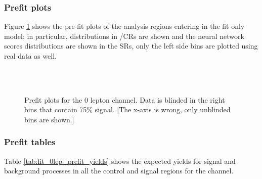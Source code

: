 \clearpage
\subsubsection{Prefit plots}
Figure \ref{fig:fit_0lep_prefit} shows the pre-fit plots of the analysis regions entering in the \zlep fit only model; 
in particular, \mjjtag distributions in \Wjets/\Zjets CRs are shown and the neural network scores distributions  are shown in the SRs, only the left side bins are plotted using real data as well.
\begin{figure}[ht]
      \centering
\\
\\
	\caption{Prefit plots for the 0 lepton channel. Data is blinded in the right bins that contain 75\% signal. [The x-axis is wrong, only unblinded bins are shown.]}
       \label{fig:fit_0lep_prefit}
\end{figure}

\clearpage
\subsubsection{Prefit tables}
Table \ref{tab:fit_0lep_prefit_yields} shows the expected yields for signal and background processes in all the control and signal regions for the \zlep channel.


